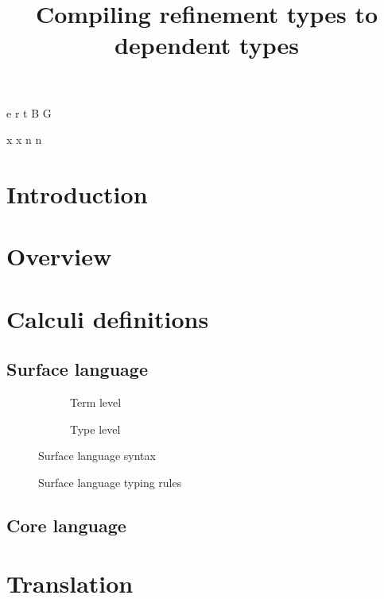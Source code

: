 \documentclass[a4paper]{article}
\begin{document}
\newnonterm e \varepsilon
\newnonterm r \rho
\newnonterm t \tau
\newnonterm B {}
\newnonterm G \Gamma
{}

\newgterm x x
\newgterm n n


\title{Compiling refinement types to dependent types}

\maketitle

\section{Introduction}

\section{Overview}

\section{Calculi definitions}

\subsection{Surface language}

\begin{figure}[ht]
  \footnotesize
  \begin{subfigure}{.6\textwidth}
	\caption{Term level}
  \end{subfigure}
  \begin{subfigure}{.5\textwidth}
	\caption{Type level}
  \end{subfigure}
  \caption{Surface language syntax}
  \label{fig:surface_syntax}
\end{figure}

\begin{figure}[ht]
  \footnotesize
  \caption{Surface language typing rules}
  \label{fig:surface_typing}
\end{figure}

\subsection{Core language}

\section{Translation}
\end{document}
